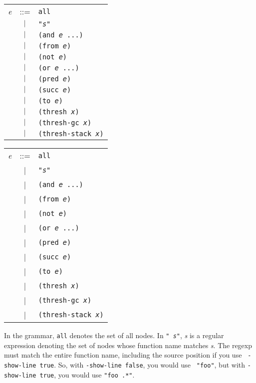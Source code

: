 \begin{latexonly}
\begin{center}
\begin{tabular}{lcl}
{\it e} & ::= & {\tt all} \\
& $\ |\ $ & {\tt "{\it s}"} \\
& $\ |\ $ & {\tt (and {\it e} ...)} \\
& $\ |\ $ & {\tt (from {\it e})} \\
& $\ |\ $ & {\tt (not {\it e})} \\
& $\ |\ $ & {\tt (or {\it e} ...)} \\
& $\ |\ $ & {\tt (pred {\it e})} \\
& $\ |\ $ & {\tt (succ {\it e})} \\
& $\ |\ $ & {\tt (to {\it e})} \\
& $\ |\ $ & {\tt (thresh {\it x})} \\
& $\ |\ $ & {\tt (thresh-gc {\it x})} \\
& $\ |\ $ & {\tt (thresh-stack {\it x})} \\
\end{tabular}
\end{center}
\end{latexonly}
\begin{htmlonly}
\begin{center}
\begin{tabular}{lcl}
{\it e} & ::= & {\tt all} \\
& | & {\tt "{\it s}"} \\
& | & {\tt (and {\it e} ...)} \\
& | & {\tt (from {\it e})} \\
& | & {\tt (not {\it e})} \\
& | & {\tt (or {\it e} ...)} \\
& | & {\tt (pred {\it e})} \\
& | & {\tt (succ {\it e})} \\
& | & {\tt (to {\it e})} \\
& | & {\tt (thresh {\it x})} \\
& | & {\tt (thresh-gc {\it x})} \\
& | & {\tt (thresh-stack {\it x})} \\
\end{tabular}
\end{center}
\end{htmlonly}

In the grammar, {\tt all} denotes the set of all nodes.  In {\tt "{\it
s}"}, {\it s} is a regular expression denoting the set of nodes whose
function name matches {\it s}.  The regexp must match the entire
function name, including the source position if you use {\tt
-show-line true}.  So, with {\tt -show-line false}, you would use {\tt
"foo"}, but with {\tt -show-line true}, you would use {\tt "foo .*"}.

